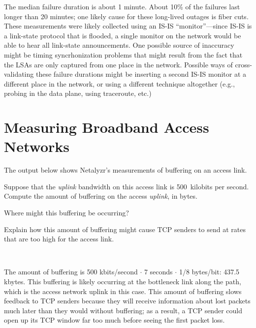 \documentclass[11pt]{article}
\newcounter{partctr}
\newcommand{\ansbelow}{\probnote{Answer legibly in the space below.}}
\newcommand{\sols}[1]{#1}
\newcommand{\sols}[1]{}
\begin{document}
\sols{
\begin{answer}
The median failure duration is about 1 minute.  About 10\% of the
failures last longer than 20 minutes; one likely cause for these
long-lived outages is fiber cuts.  These measurements were likely
collected using an IS-IS ``monitor''---since IS-IS is a link-state
protocol that is flooded, a single monitor on the network would be able
to hear all link-state announcements.  One possible source of inaccuracy
might be timing syncrhonization problems that might result from the fact
that the LSAs are only captured from one place in the network.  Possible
ways of cross-validating these failure durations might be inserting a
second IS-IS monitor at a different place in the network, or using a
different technique altogether (e.g., probing in the data plane, using
traceroute, etc.)
\end{answer}
}


\newpage
\section{Measuring Broadband Access Networks}

 The output below shows Netalyzr's measurements of buffering on
an access link.  
\begin{center}
\end{center}
\setcounter{partctr}{0}
\begin{list}{\bf{}.}{}
\item Suppose that the {\em uplink} bandwidth on this access link is
  500~kilobits per second.  Compute the amount of buffering on the
  access {\em uplink}, in bytes.
\item Where might this buffering be occurring?
\item Explain how this amount of buffering might cause TCP senders to
  send at rates that are too high for the access link.
\end{list}
~\ansbelow
\eprob

\sols{
\begin{answer}
The amount of buffering is 500 kbits/second $\cdot$ 7 seconds $\cdot$ 1/8
bytes/bit: 437.5 kbytes.  This buffering is
likely occurring at the bottleneck link along the path, which is the
access network uplink in this case.  This amount of buffering slows
feedback to TCP senders because they will receive information about lost
packets much later than they would without buffering; as a result, a TCP
sender could open up its TCP window far too much before seeing the first
packet loss.
\end{answer}
}
\end{document}
